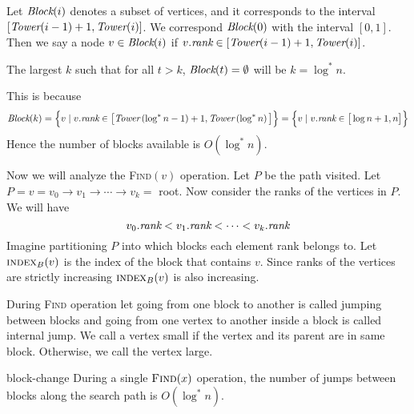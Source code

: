 Let $\emph{Block}(i)$ denotes a subset of vertices, and it corresponds to the interval $[\emph{Tower}(i-1)+1, \emph{Tower}(i)]$. We correspond $\emph{Block}(0)$ with the interval $ [0,1]$. Then we say a node $v\in \emph{Block}(i)$ if $v.\emph{rank}\in [\emph{Tower}(i-1)+1, \emph{Tower}(i)]$.
\begin{observation}
	The largest $k$ such that for all $t>k$, $\emph{Block}(t)=\emptyset$ will be $k=\log^*n$.
\end{observation}This is because $$\emph{Block}(k)=\Big\{v\mid v.\emph{rank}\in \big[\emph{Tower}\left(\log^*n-1\right)+1,\emph{Tower}\left(\log^*n\right)\big]\Big\}=\Big\{v\mid v.\emph{rank}\in \big[ \log n+1,n\big]\Big\}$$Hence the number of blocks available is $O(\log^*n)$.

Now we will analyze the \textsc{Find}$(v)$ operation. Let $P$ be the path visited. Let $P=v=v_0\to v_1\to\cdots \to v_k=$ root. Now consider the ranks of the vertices in $P$. We will have $$v_0.\emph{rank}<v_1.\emph{rank}<\cdots <v_k.\emph{rank}$$ Imagine partitioning $P$ into which blocks each element rank belongs to. Let $\textsc{index}_B(v)$ is the index of the block that contains $v$. Since ranks of the vertices are strictly increasing $\textsc{index}_B(v)$ is also increasing.

During \textsc{Find} operation let going from one block to another is called jumping between blocks and going from one vertex to another inside a block is called internal jump. We call a vertex small if the vertex and its parent are in same block. Otherwise, we call the vertex large.
\begin{lemma}{}{block-change}
	During a single $\textsc{Find}(x)$ operation, the number of jumps between blocks along the search path is $O(\log^*n)$.
\end{lemma}

